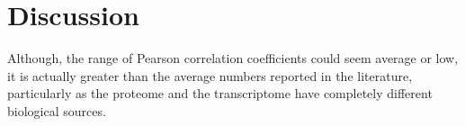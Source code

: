 \section{Discussion}

Although, the range of Pearson correlation coefficients could seem average or
low, it is actually greater than the average numbers reported in the literature,
particularly as the proteome and the transcriptome have completely different
biological sources.









